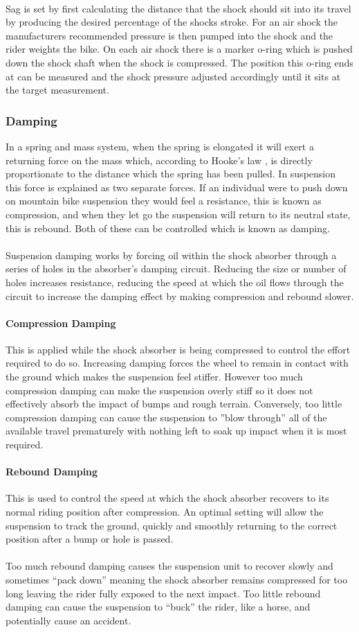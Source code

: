 		\\
		Sag is set by first calculating the distance that the shock should sit into its travel by producing the desired percentage of the shocks stroke. For an air shock the manufacturers recommended pressure is then pumped into the shock and the rider weights the bike. On each air shock there is a marker o-ring which is pushed down the shock shaft when the shock is compressed. The position this o-ring ends at can be measured and the shock pressure adjusted accordingly until it sits at the target measurement. 
	\subsubsection{Damping}
		In a spring and mass system, when the spring is elongated it will exert a returning force on the mass which, according to Hooke's law \citep{rychlewski1984hooke}, is directly proportionate to the distance which the spring has been pulled. In suspension this force is explained as two separate forces. If an individual were to push down on mountain bike suspension they would feel a resistance, this is known as compression, and when they let go the suspension will return to its neutral state, this is rebound. Both of these can be controlled which is known as damping.
		\\\\
		Suspension damping works by forcing oil within the shock absorber through a series of holes in the absorber’s damping circuit. Reducing the size or number	of holes increases resistance, reducing the speed at which the oil flows through the circuit to increase the damping effect by making compression and rebound slower.
	\paragraph{Compression Damping} 
		This is applied while the shock absorber is being compressed to control the effort required to do so. Increasing damping forces the wheel to remain in contact with the ground which makes the suspension feel stiffer. However too much compression damping can make the suspension overly stiff so it does not effectively absorb the impact of bumps and rough terrain. Conversely, too little compression damping can cause the suspension to ”blow through” all of the available travel prematurely with nothing left to soak up impact when it is most required. 
	\paragraph{Rebound Damping}
		This is used to control the speed at which the shock absorber recovers to its normal riding position after compression. An optimal setting will allow the suspension to track the ground, quickly and smoothly returning to the correct position after a bump or hole is passed. 
		\\\\
		Too much rebound damping causes the suspension unit to recover slowly and sometimes “pack down” meaning the shock absorber remains compressed for too long leaving the rider fully exposed to the next impact. Too little rebound damping can cause the suspension to “buck” the rider, like a horse, and potentially cause an accident.
